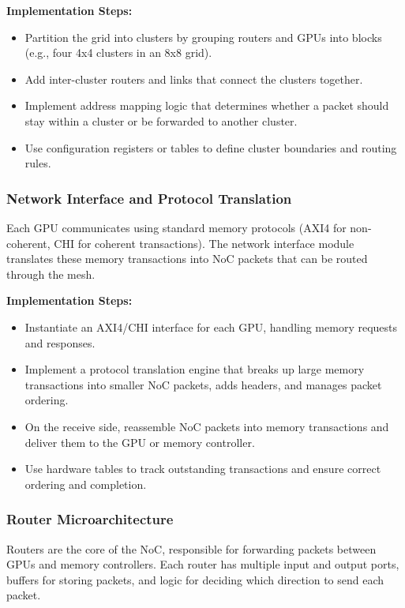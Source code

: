\documentclass[11pt,a4paper]{article}
\begin{document}
\textbf{Implementation Steps:}
\begin{itemize}
    \item Partition the grid into clusters by grouping routers and GPUs into blocks (e.g., four 4x4 clusters in an 8x8 grid).
    \item Add inter-cluster routers and links that connect the clusters together.
    \item Implement address mapping logic that determines whether a packet should stay within a cluster or be forwarded to another cluster.
    \item Use configuration registers or tables to define cluster boundaries and routing rules.
\end{itemize}

\subsubsection{Network Interface and Protocol Translation}
Each GPU communicates using standard memory protocols (AXI4 for non-coherent, CHI for coherent transactions). The network interface module translates these memory transactions into NoC packets that can be routed through the mesh.

\textbf{Implementation Steps:}
\begin{itemize}
    \item Instantiate an AXI4/CHI interface for each GPU, handling memory requests and responses.
    \item Implement a protocol translation engine that breaks up large memory transactions into smaller NoC packets, adds headers, and manages packet ordering.
    \item On the receive side, reassemble NoC packets into memory transactions and deliver them to the GPU or memory controller.
    \item Use hardware tables to track outstanding transactions and ensure correct ordering and completion.
\end{itemize}

\subsubsection{Router Microarchitecture}
Routers are the core of the NoC, responsible for forwarding packets between GPUs and memory controllers. Each router has multiple input and output ports, buffers for storing packets, and logic for deciding which direction to send each packet.
\end{document}
